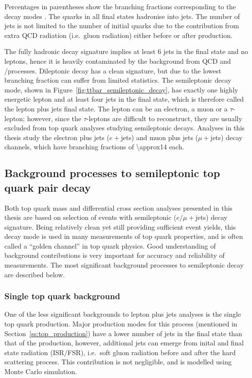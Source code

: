 Percentages in parentheses show the branching fractions corresponding to the decay modes \autocite{PDG}. The quarks in
all final states hadronise into jets. The number of jets is not limited to the number of initial quarks due to the
contribution from extra QCD radiation (i.e.\ gluon radiation) either before or after \ttbar production.

The fully hadronic \ttbar decay signature implies at least 6 jets in the final state and no leptons, hence it is heavily
contaminated by the background from QCD and \W/\ZpJets processes. Dileptonic \ttbar decay has a clean signature, but due
to the lowest branching fraction can suffer from limited statistics. The semileptonic decay mode, shown in
Figure~\ref{fig:ttbar_semileptonic_decay}, has exactly one highly energetic lepton and at least four jets in the final
state, which is therefore called the lepton plus jets final state. The lepton can be an electron, a muon or a
$\tau$-lepton; however, since the $\tau$-leptons are difficult to reconstruct, they are usually excluded from top quark
analyses studying semileptonic decays. Analyses in this thesis study the electron plus jets ($e+$jets) and muon plus
jets ($\mu+$jets) decay channels, which have branching fractions of \SI{\approx14}{\pc} each.



\newpage
\subsection{Background processes to semileptonic top quark pair decay}
\label{ss:backgrounds}
Both top quark mass and differential cross section analyses presented in this thesis are based on selection of events
with semileptonic ($e/\mu+$jets) \ttbar decay signature. Being relatively clean yet still providing sufficient event
yields, this decay mode is used in many measurements of top quark properties, and is often called a ``golden channel''
in top quark physics. Good understanding of background contributions is very important for accuracy and reliability of
measurements. The most significant background processes to semileptonic \ttbar decay are described below.

\subsubsection*{Single top quark background}
One of the less significant backgrounds to lepton plus jets analyses is the single top quark production. Major
production modes for this process (mentioned in Section~\ref{ss:top_production}) have a lower number of jets in the
final state than that of the \ttbar production, however, additional jets can emerge from inital and final state
radiation (ISR/FSR), i.e.\ soft gluon radiation before and after the hard scattering process. This contribution is not
negligible, and is modelled using Monte Carlo simulation.

